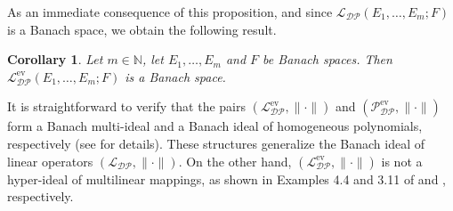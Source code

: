 \documentclass[12 pt]{article}%
\newtheorem{proposition}[theorem]{Proposition}
\newtheorem{corollary}[theorem]{Corollary}
\newtheorem{final remark}[theorem]{Final Remark}
\begin{document}
%

As an immediate consequence of this proposition, and since $\mathcal{L_{DP}}(E_1,\dots,E_m;F)$ is a Banach space, we obtain the following result.

\begin{corollary}
	Let $m \in \mathbb{N}$, let $E_1,\dots,E_m$ and $F$ be Banach spaces. Then $\mathcal{L_{DP}^{\mathrm{ev}}}(E_1,\dots,E_m;F)$ is a Banach space.
\end{corollary}

It is straightforward to verify that the pairs $(\mathcal{L_{DP}^{\mathrm{ev}}}, \|\cdot\|)$ and $(\mathcal{P_{DP}^{\mathrm{ev}}}, \|\cdot\|)$ form a Banach multi-ideal and a Banach ideal of homogeneous polynomials, respectively (see \cite{FG03, P83} for details). These structures generalize the Banach ideal of linear operators $(\mathcal{L_{DP}}, \|\cdot\|)$. On the other hand, $(\mathcal{L_{DP}^{\mathrm{ev}}}, \|\cdot\|)$ is not a hyper-ideal of multilinear mappings, as shown in Examples 4.4 and 3.11 of \cite{BT15} and \cite{BT18}, respectively.
\end{document}
